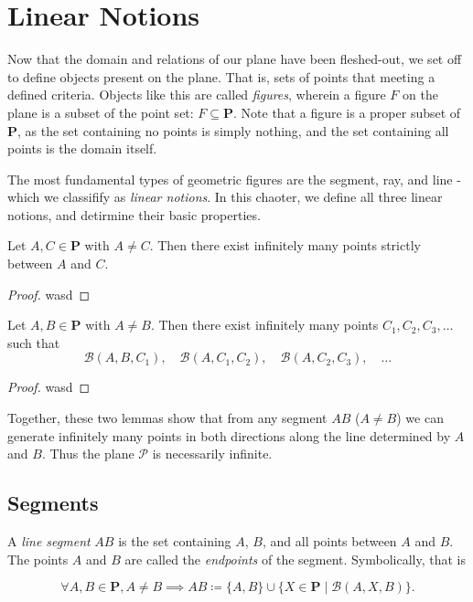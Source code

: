 \documentclass[../../../main/main.tex]{subfiles}
\begin{document}
\chapter{Linear Notions}

Now that the domain and relations of our plane have been fleshed-out, we set off to define objects present on the plane. That is, sets of points that meeting a defined criteria. Objects like this are called \textit{figures}, wherein a figure $F$ on the plane is a subset of the point set: $F \subseteq \mathbf{P}$. Note that a figure is a proper subset of $\mathbf{P}$, as the set containing no points is simply nothing, and the set containing all points is the domain itself.

The most fundamental types of geometric figures are the segment, ray, and line - which we classifify as \textit{linear notions}. In this chaoter, we define all three linear notions, and detirmine their basic properties.

\begin{theorem}
  \label{lem:infinite-interior}
  Let $A,C\in\mathbf{P}$ with $A\neq C$.  Then there exist infinitely many
  points strictly between $A$ and $C$.
\end{theorem}
\begin{proof}
    wasd
\end{proof}

\begin{theorem}
  \label{lem:infinite-outward}
  Let $A,B\in\mathbf{P}$ with $A\neq B$.  Then there exist infinitely many
  points $C_1,C_2,C_3,\dots$ such that
  \[
  \mathcal{B}(A,B,C_1),\quad
  \mathcal{B}(A,C_1,C_2),\quad
  \mathcal{B}(A,C_2,C_3),\quad\dots
  \]
\end{theorem}
\begin{proof}
  wasd
\end{proof}

Together, these two lemmas show that from any segment $AB$ ($A\neq B$) we
can generate infinitely many points in both directions along the line
determined by $A$ and $B$.  Thus the plane $\mathcal{P}$ is necessarily
infinite.

\section{Segments}

A \textit{line segment} $AB$ is the set containing $A$, $B$, and all points between $A$ and $B$. The points $A$ and $B$ are called the \textit{endpoints} of the segment. Symbolically, that is
\begin{definition}[Segment]
    \[
    \forall A, B \in \mathbf{P}, A \neq B \implies AB \coloneqq \{A, B\} \cup \{ X \in \mathbf{P} \mid \mathcal{B}(A, X, B) \}.
    \]
\end{definition}
\end{document}
